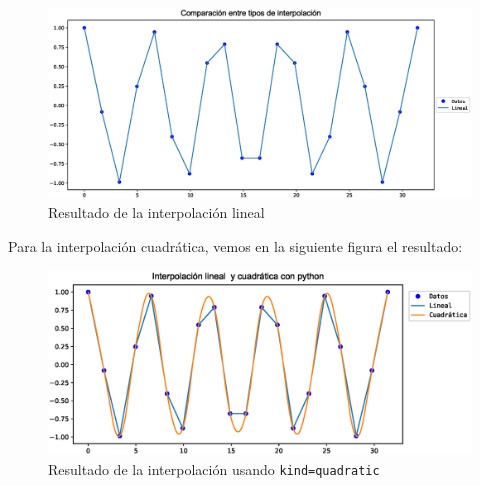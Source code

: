 \begin{figure}[H]
	\centering
	\hspace*{-0.2cm}\includegraphics[scale=0.5]{Imagenes/interpolacion_02.eps}
	\caption{Resultado de la interpolación lineal}
\end{figure}
Para la interpolación cuadrática, vemos en la siguiente figura el resultado:
\begin{figure}[H]
	\centering
	\hspace*{-0.2cm}\includegraphics[scale=0.75]{Imagenes/interpolacion_03_2018.eps}
	\caption{Resultado de la interpolación usando \texttt{kind=quadratic}}
\end{figure}
